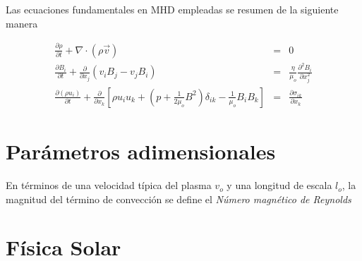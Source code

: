 Las ecuaciones fundamentales en MHD empleadas se resumen de la siguiente manera

\begin{eqnarray}
\frac{\partial \rho}{\partial t} + \nabla\cdot(\rho\vec{v}) &=& 0\nonumber\\
\frac{\partial B_{i}}{\partial t} + \frac{\partial}{\partial x_{j}}(v_{i}B_{j}-v_{j}B_{i}) &=& \frac{\eta}{\mu_{o}}\frac{\partial^{2}B_{i}}{\partial x_{j}^{2}}\\
\frac{\partial(\rho u_{i})}{\partial t}+\frac{\partial}{\partial x_{k}}\left[\rho u_{i}u_{k}+\left(p+\frac{1}{2\mu_{o}}B^{2}\right)\delta_{ik}-\frac{1}{\mu_{o}}B_{i}B_{k}\right] &=& \frac{\partial \sigma_{ik}}{\partial x_{k}}\nonumber
\end{eqnarray}




\section{Parámetros adimensionales}
En términos de una velocidad típica del plasma $v_{o}$ y una longitud de escala $l_{o}$, la magnitud del término de convección se define el \emph{Número magnético de Reynolds}
\section{Física Solar }
